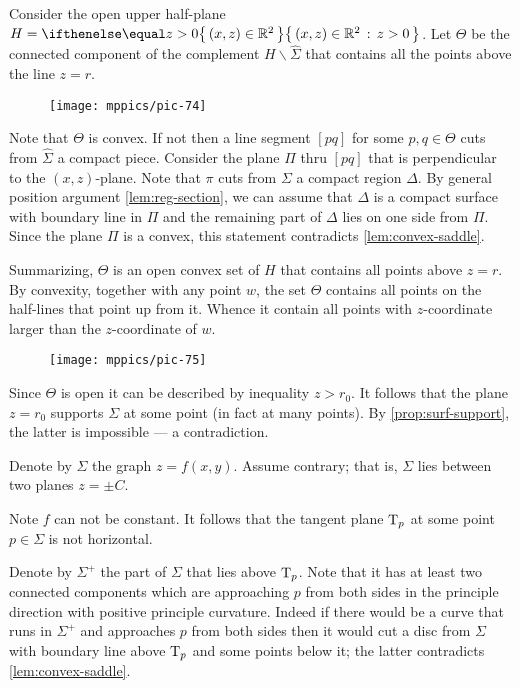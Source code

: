 Consider the open upper half-plane $H=\set{(x,z)\in \RR^2}{z> 0}$. 
Let $\Theta$ be the connected component of the complement $H\backslash \hat \Sigma$ that contains all the points above the line $z=r$.

\begin{figure}[h!]
\vskip-0mm
\centering
\texttt{[image: mppics/pic-74]}
\vskip0mm
\end{figure}

Note that $\Theta$ is convex.
If not then a line segment $[pq]$ for some $p,q\in \Theta$ cuts from $\hat\Sigma$ a compact piece.
Consider the plane $\Pi$ thru $[pq]$ that is perpendicular to the $(x,z)$-plane.
Note that $\pi$ cuts from $\Sigma$ a compact region $\Delta$.
By general position argument \ref{lem:reg-section}, 
we can assume that $\Delta$ is a compact surface with boundary line in $\Pi$ and the remaining part of $\Delta$ lies on one side from $\Pi$.
Since the plane $\Pi$ is a convex, this statement contradicts \ref{lem:convex-saddle}.

Summarizing, $\Theta$ is an open convex set of $H$ that contains all points above $z=r$.
By convexity, together with any point $w$, the set $\Theta$ contains all points on the half-lines that point up from it. 
Whence it contain all points with $z$-coordinate larger than the $z$-coordinate of $w$.
\begin{figure}[h!]
\vskip-0mm
\centering
\texttt{[image: mppics/pic-75]}
\vskip0mm
\end{figure}
Since $\Theta$ is open it can be described by inequality $z>r_0$.
It follows that the plane $z=r_0$ supports $\Sigma$ at some point (in fact at many points).
By \ref{prop:surf-support}, the latter is impossible --- a contradiction.
\qeds

Denote by $\Sigma$ the graph $z=f(x,y)$.
Assume contrary; that is, $\Sigma$ lies between two planes $z=\pm C$.

Note $f$ can not be constant.
It follows that the tangent plane $\mathrm{T}_p$ at some point $p\in\Sigma$ is not horizontal.

Denote by $\Sigma^+$ the part of $\Sigma$ that lies above $\mathrm{T}_p$.
Note that it has at least two connected components which are approaching $p$ from both sides 
in the principle direction with positive principle curvature.
Indeed if there would be a curve that runs in $\Sigma^+$ and approaches $p$ from both sides then it would cut a disc from $\Sigma$ with boundary line above $\mathrm{T}_p$ and some points below it;
the latter contradicts \ref{lem:convex-saddle}.


